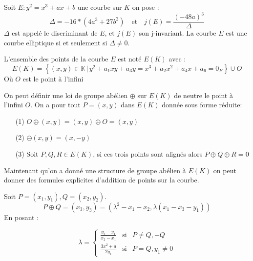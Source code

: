 \documentclass[12pt]{article}
\begin{document}
\begin{defi}
Soit $E : y^2 = x^3 + ax +b$ une courbe sur $K$ on pose : 
\begin{equation*}
\Delta = -16*(4a^3 + 27b^2) \quad \text{et} \quad j(E) = \frac{(-48a)^3}{\Delta}
\end{equation*}
$\Delta$ est appelé le discriminant de $E$, et $j(E)$ son j-invariant. La courbe $E$ est une courbe elliptique si et seulement si $\Delta \ne 0$.
\end{defi}

\begin{defi}
L'ensemble des points de la courbe $E$ est noté $E(K)$ avec :
\begin{equation*}
E(K) = \left\{ (x,y) \in \mathbb{K} \, | \, y^2 + a_1xy + a_3y  = x^3 + a_2x^2 + a_4x + a_6 = 0_E \right\} \cup {O}
\end{equation*}
Où $O$ est le point à l'infini
\end{defi}


On peut définir une loi de groupe abélien $\oplus$ sur $E(K)$ de neutre le point à l'infini $O$. On a pour tout $P = (x,y) $ dans $E(K)$ donnée sous forme réduite:
\begin{itemize}
\item[(1)] $O \oplus (x,y) = (x,y) \oplus O = (x,y)$
\item[(2)] $\ominus (x,y) = (x, -y)$
\item[(3)] Soit $P,Q,R \in E(K)$, si ces trois points sont alignés alors $P \oplus Q \oplus R = 0$
\end{itemize}

Maintenant qu'on a donné une structure de groupe abélien à $E(K)$ on peut donner des formules explicites d'addition de points sur la courbe.

\begin{prop}
Soit $P =(x_1, y_1), Q=(x_2, y_2)$.
$$P \oplus Q = (x_3, y_3) = (\lambda^2 -x_1 -x_2, \lambda(x_1 - x_3 - y_1)) $$
En posant : 

\begin{equation}
\lambda =
\left\lbrace
\begin{array}{ccc}
\frac{y_2 - y_1}{x_2 - x_1} & \mbox{si} & P \ne Q, -Q  \\
\frac{3x^2 + a}{2y_1} & \mbox{si}  & P = Q, y_1 \ne 0
\end{array}\right.
\end{equation}
\end{prop}
\end{document}
